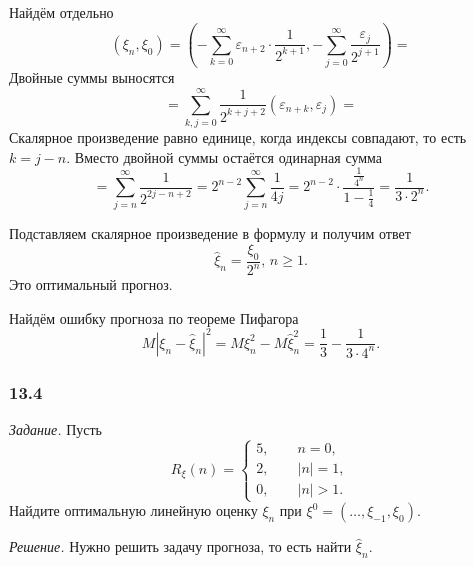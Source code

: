 Найдём отдельно
\begin{equation*}
  \left( \xi_n, \xi_0 \right) =
  \left(
    -\sum \limits_{k = 0}^{ \infty } \varepsilon_{n + 2} \cdot \frac{1}{2^{k + 1}},
    -\sum \limits_{j = 0}^{ \infty } \frac{ \varepsilon_j}{2^{j + 1}}
  \right) =
\end{equation*}
Двойные суммы выносятся
\begin{equation*}
  = \sum \limits_{k, j = 0}^{ \infty }
    \frac{1}{2^{k + j + 2}} \left( \varepsilon_{n + k}, \varepsilon_j \right) =
\end{equation*}
Скалярное произведение равно единице, когда индексы совпадают, то есть $k = j - n$.
Вместо двойной суммы остаётся одинарная сумма
\begin{equation*}
  = \sum \limits_{j = n}^{ \infty } \frac{1}{2^{2j - n + 2}} =
  2^{n - 2} \sum \limits_{j = n}^{ \infty } \frac{1}{4j} =
  2^{n - 2} \cdot \frac{ \frac{1}{4^n}}{1 - \frac{1}{4}} =
  \frac{1}{3 \cdot 2^n}.
\end{equation*}

Подставляем скалярное произведение в формулу и получим ответ
\begin{equation*}
  \hat{ \xi }_n = \frac{ \xi_0}{2^n}, \,
  n \geq 1.
\end{equation*}
Это оптимальный прогноз.

Найдём ошибку прогноза по теореме Пифагора
\begin{equation*}
  M \left| \xi_n - \hat{ \xi }_n \right|^2 =
  M \xi_n^2 - M \hat{ \xi }_n^2 =
  \frac{1}{3} - \frac{1}{3 \cdot 4^n}.
\end{equation*}

\subsubsection*{13.4}

\textit{Задание.}
Пусть
\begin{equation*}
  R_{ \xi } \left( n \right) =
  \begin{cases}
    5, \qquad n = 0, \\
    2, \qquad \left| n \right| = 1, \\
    0, \qquad \left| n \right| > 1.
  \end{cases}
\end{equation*}
Найдите оптимальную линейную оценку $ \xi_n$ при $ \xi^0 = \left( \dotsc, \xi_{-1}, \xi_0 \right) $.

\textit{Решение.}
Нужно решить задачу прогноза, то есть найти $ \hat{ \xi }_n$.

